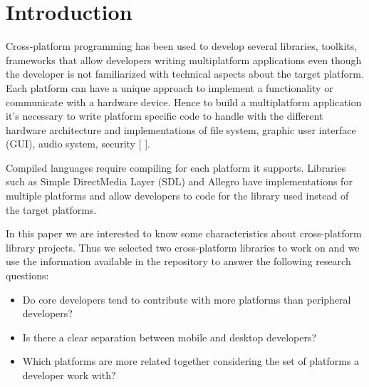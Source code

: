 \documentclass[10pt, conference]{IEEEtran}
\begin{document}
%
\IEEEpeerreviewmaketitle



\section{Introduction}
Cross-platform programming has been used to develop several libraries, toolkits, frameworks that allow developers writing multiplatform applications even though the developer is not familiarized with technical aspects about the target platform. Each platform can have a unique approach to implement a functionality or communicate with a hardware device. Hence to build a multiplatform application it’s necessary to write platform specific code to handle with the different hardware architecture and implementations of file system, graphic user interface (GUI), audio system, security [ ]. 

Compiled languages require compiling for each platform it supports. Libraries such as Simple DirectMedia Layer (SDL) and Allegro have implementations for multiple platforms and allow developers to code for the library used instead of the target platforms.     

In this paper we are interested to know some characteristics about cross-platform library projects. Thus we selected two cross-platform libraries to work on and we use the  information available in the repository to answer the following research questions:

\begin{itemize}
\item Do core developers tend to contribute with more platforms than peripheral developers?
\item Is there a clear separation between mobile and desktop developers?
\item  Which platforms are more related together considering the set of platforms a developer work with? 
\end{itemize}
\end{document}
